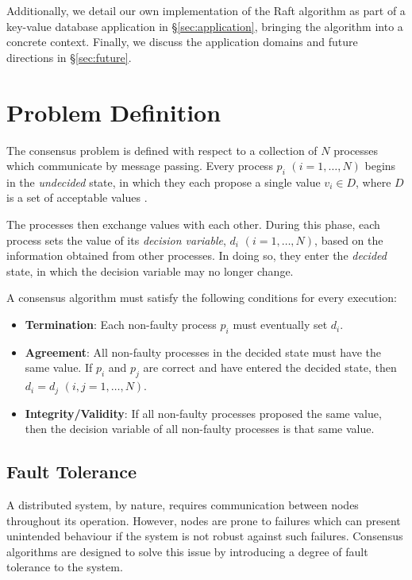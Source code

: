 \documentclass[12pt, a4paper]{article}
\begin{document}
Additionally, we detail our own implementation of the Raft algorithm as part of a key-value database application in \S\ref{sec:application}, bringing the algorithm into a concrete context. Finally, we discuss the application domains and future directions in \S\ref{sec:future}.


\section{Problem Definition} \label{sec:consensus-def}

The consensus problem is defined with respect to a collection of $N$ processes which communicate by message passing. Every process $p_{i}$ $(i = 1, \ldots, N)$ begins in the \textit{undecided} state, in which they each propose a single value $v_{i} \in D$, where $D$ is a set of acceptable values \cite{coulouris2005distributed}.

The processes then exchange values with each other. During this phase, each process sets the value of its \textit{decision variable}, $d_i$ $(i = 1, \ldots, N)$, based on the information obtained from other processes. In doing so, they enter the \textit{decided} state, in which the decision variable may no longer change.

A consensus algorithm must satisfy the following conditions for every execution:

\begin{itemize}
  \item \textbf{Termination}: Each non-faulty process $p_i$ must eventually set
    $d_i$.
  \item \textbf{Agreement}: All non-faulty processes in the decided state
    must have the same value. If $p_{i}$ and $p_{j}$ are correct and have
    entered the decided state, then $d_{i} = d_{j}$ $(i, j = 1, \ldots, N)$.
  \item \textbf{Integrity/Validity}: If all non-faulty processes proposed
    the same value, then the decision variable of all non-faulty processes is
    that same value.
\end{itemize}

\subsection{Fault Tolerance}
A distributed system, by nature, requires communication between nodes throughout its operation. However, nodes are prone to failures which can present unintended behaviour if the system is not robust against such failures. Consensus algorithms are designed to
solve this issue by introducing a degree of fault tolerance to the system.
\end{document}
